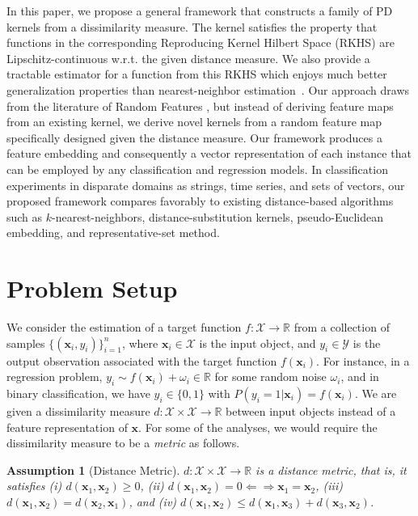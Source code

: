 \documentclass{article}
\newtheorem{assumption}{Assumption}
\newcommand{\R}{\mathbb{R}}
\newcommand{\X}{\mathcal{X}}
\newcommand{\Y}{\mathcal{Y}}
\newcommand{\1}{\mathbf{1}}
\newcommand{\bx}{\boldsymbol{x}}
\begin{document}
In this paper, we propose a general framework that constructs a family of PD kernels from a dissimilarity measure. The kernel satisfies the property that functions in the corresponding Reproducing Kernel Hilbert Space (RKHS) are Lipschitz-continuous w.r.t. the given distance measure. We also provide a tractable estimator for a function from this RKHS which enjoys much better generalization properties than nearest-neighbor estimation~\cite{chen2009similarity}. Our approach draws from the literature of Random Features \cite{rahimi2008random}, but instead of deriving feature maps from an existing kernel, we derive novel kernels from a random feature map specifically designed given the distance measure. Our framework produces a feature embedding  and consequently a vector representation of each instance that can be employed by any classification and regression models. In classification experiments in disparate domains as strings, time series, and sets of vectors, our proposed framework compares favorably to existing distance-based algorithms such as $k$-nearest-neighbors, distance-substitution kernels, pseudo-Euclidean embedding, and representative-set method.


\section{Problem Setup}

We consider the estimation of a target function $f:\X \rightarrow \R$ from a collection of samples $\{(\bx_i,y_i)\}_{i=1}^n$, where $\bx_i\in\X$ is the input object, and $y_i\in\Y$ is the output observation associated with the target function $f(\bx_i)$. For instance, in a regression problem, $y_i\sim f(\bx_i)+\omega_i \in \R$ for some random noise $\omega_i$, and in binary classification, we have $y_i\in\{0,1\}$ with $P(y_i=1|\bx_i)=f(\bx_i)$. We are given a dissimilarity measure $d:\X\times \X\rightarrow \R$ between input objects instead of a feature representation of $\bx$. For some of the analyses, we would require the dissimilarity measure to be a \emph{metric} as follows.

\begin{assumption}[Distance Metric]\label{assume:metric}
$d:\X\times \X\rightarrow \R$ is a distance metric, that is, it satisfies (i) $d(\bx_1,\bx_2)\geq 0$, (ii) $d(\bx_1,\bx_2)=0 \Leftarrow \Rightarrow \bx_1=\bx_2$, (iii) $d(\bx_1,\bx_2)=d(\bx_2,\bx_1)$, and (iv) $d(\bx_1,\bx_2)\leq d(\bx_1,\bx_3) + d(\bx_3,\bx_2)$.
\end{assumption}
\end{document}
